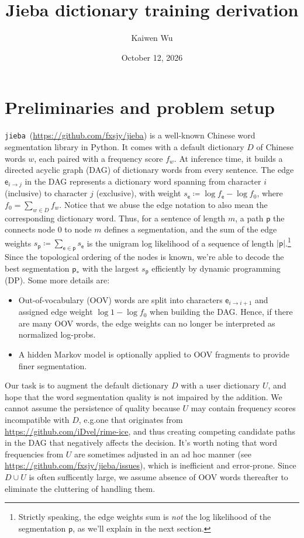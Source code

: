 \documentclass{article}
\title{Jieba dictionary training derivation}
\author{Kaiwen Wu}
\date{October 12, 2026}
\newcommand{\jb}{\texttt{jieba}}
\begin{document}
\maketitle

\section{Preliminaries and problem setup}
\jb\ (\url{https://github.com/fxsjy/jieba}) is a well-known Chinese word segmentation library in Python.
It comes with a default dictionary $D$ of Chinese words $w$, each paired with a frequency score $f_w$.
At inference time, it builds a directed acyclic graph (DAG) of dictionary words from every sentence.
The edge $\mathsf{e}_{i \to j}$ in the DAG represents a dictionary word spanning from character $i$ (inclusive) to character $j$ (exclusive), with weight $s_\mathsf{e} \coloneqq \log f_\mathsf{e} - \log f_0$, where $f_0 = \sum_{w \in D} f_w$.
Notice that we abuse the edge notation to also mean the corresponding dictionary word.
Thus, for a sentence of length $m$, a path $\mathsf{p}$ the connects node 0 to node $m$ defines a segmentation, and the sum of the edge weights $s_\mathsf{p} \coloneqq \sum_{\mathsf{e} \in \mathsf{p}} s_\mathsf{e}$ is the unigram log likelihood of a sequence of length $|\mathsf{p}|$.\footnote{Strictly speaking, the edge weights sum is \emph{not} the log likelihood of the segmentation $\mathsf{p}$, as we'll explain in the next section.}
Since the topological ordering of the nodes is known, we're able to decode the best segmentation $\mathsf{p}_\ast$ with the largest $s_\mathsf{p}$ efficiently by dynamic programming (DP).
Some more details are:

\begin{itemize}
    \item Out-of-vocabulary (OOV) words are split into characters $\mathsf{e}_{i \to i+1}$ and assigned edge weight $\log{1}-\log f_0$ when building the DAG. Hence, if there are many OOV words, the edge weights can no longer be interpreted as normalized log-probs.
    \item A hidden Markov model is optionally applied to OOV fragments to provide finer segmentation.
\end{itemize}

Our task is to augment the default dictionary $D$ with a user dictionary $U$, and hope that the word segmentation quality is not impaired by the addition.
We cannot assume the persistence of quality because $U$ may contain frequency scores incompatible with $D$, e.g.\@ one that originates from \url{https://github.com/iDvel/rime-ice}, and thus creating competing candidate paths in the DAG that negatively affects the decision.
It's worth noting that word frequencies from $U$ are sometimes adjusted in an ad hoc manner (see \url{https://github.com/fxsjy/jieba/issues}), which is inefficient and error-prone.
Since $D \cup U$ is often sufficently large, we assume absence of OOV words thereafter to eliminate the cluttering of handling them.
\end{document}
